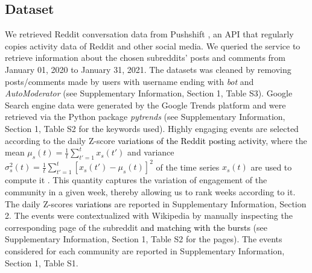 \documentclass[fleqn,10pt]{wlscirep}
\newcommand{\new}[1]{\textcolor{black}{#1}}
\begin{document}
\subsection*{Dataset}
We retrieved Reddit conversation data from Pushshift \cite{baumgartner2020pushshift}, an API that regularly copies activity data of Reddit and other social media. We queried the service to retrieve information about the chosen subreddits' posts and comments from January 01, 2020 to January 31, 2021. The datasets was cleaned by removing posts/comments made by users with username ending with \emph{bot} and \emph{AutoModerator} (see Supplementary Information, Section 1, Table S3).
%
Google Search engine data were generated by the Google Trends platform and were retrieved via the Python package \emph{pytrends} (see Supplementary Information, Section 1, Table S2 for the keywords used).
Highly engaging events are selected according to the daily Z-score \new{variations of the Reddit posting activity}, where the mean $\mu_s(t) = \frac{1}{t} \sum_{t' = 1}^{t} x_s(t')$ and variance $\sigma^2_s(t)=\frac{1}{t} \sum_{t' = 1}^{t} \left[ x_s(t') - \mu_s(t) \right]^2$ of the time series $x_s(t)$ are used to compute it \cite{mancini_self-induced_2022}.
This quantity captures the variation of engagement of the community in a given week, thereby allowing us to rank weeks according to it.
The daily Z-scores \new{variations} are reported in Supplementary Information, Section 2.
The events were contextualized with Wikipedia by manually inspecting the corresponding page of the subreddit \new{and matching with the bursts} (see Supplementary Information, Section 1, Table S2 for the pages). The events considered for each community are reported in Supplementary Information, Section 1, Table S1.
%
\end{document}
